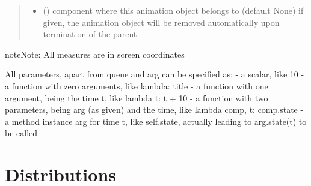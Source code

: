 \documentclass[letterpaper,10pt,english]{sphinxmanual}
\begin{document}
\begin{fulllineitems}
\begin{quote}
\begin{description}
\begin{itemize}
\item {} 
 ({\hyperref[\detokenize{Reference:salabim.Component}]{}}) \textendash{} component where this animation object belongs to (default None) 
if given, the animation object will be removed
automatically upon termination of the parent

\end{itemize}

\end{description}\end{quote}

\begin{sphinxadmonition}{note}{Note:}
All measures are in screen coordinates 

All parameters, apart from queue and arg can be specified as: 
- a scalar, like 10 
- a function with zero arguments, like lambda: title 
- a function with one argument, being the time t, like lambda t: t + 10 
- a function with two parameters, being arg (as given) and the time, like lambda comp, t: comp.state 
- a method instance arg for time t, like self.state, actually leading to arg.state(t) to be called
\end{sphinxadmonition}

\end{fulllineitems}



\section{Distributions}
\label{\detokenize{Reference:distributions}}
\end{document}
